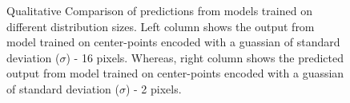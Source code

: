 \begin{figure}[!htp]
{        \label{fig:K4A}}
    \caption[Raw Center Prediction Comparison] {Qualitative Comparison of predictions from models trained on different distribution sizes. Left column shows the output from model trained on center-points encoded with a guassian of standard deviation ($\sigma$) - 16 pixels. Whereas, right column shows the predicted output from model trained on center-points encoded with a guassian of standard deviation ($\sigma$) - 2 pixels. }
    \label{fig:Keypoints_comparison}
\end{figure}



